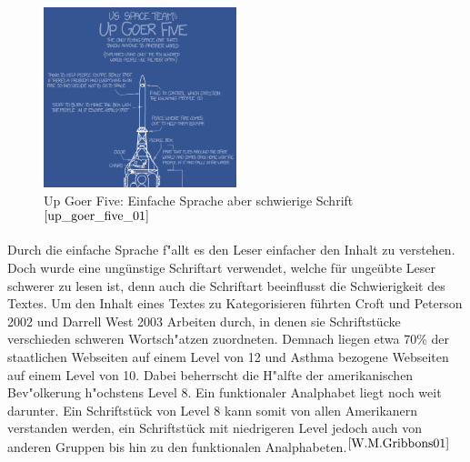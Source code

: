 \begin{figure}[h]
	\centering
		\includegraphics[width=0.50\textwidth]{Daten/up_goer_five_part.png}
	\caption{Up Goer Five: Einfache Sprache aber schwierige Schrift $^{\ref{up_goer_five_01}}$}
	\label{fig:GoerFive}
\end{figure}
 Durch die einfache Sprache f"allt es den Leser einfacher den Inhalt zu verstehen. Doch wurde eine ungünstige Schriftart verwendet, welche für ungeübte Leser schwerer zu lesen ist, denn auch die Schriftart beeinflusst die Schwierigkeit des Textes.
Um den Inhalt eines Textes zu Kategorisieren führten Croft und Peterson 2002 und Darrell West 2003 Arbeiten durch, in denen sie Schriftstücke verschieden schweren Wortsch"atzen zuordneten.
Demnach liegen etwa 70\% der staatlichen Webseiten auf einem Level von 12 und Asthma bezogene Webseiten auf einem Level von 10.
Dabei beherrscht die H"alfte der amerikanischen Bev"olkerung h"ochstens Level 8. Ein funktionaler Analphabet liegt noch weit darunter.
Ein Schriftstück von Level 8 kann somit von allen Amerikanern verstanden werden, ein Schriftstück mit niedrigeren Level jedoch auch von anderen Gruppen bis hin zu den funktionalen Analphabeten.$^{\ref{W.M.Gribbons01}}$\\

